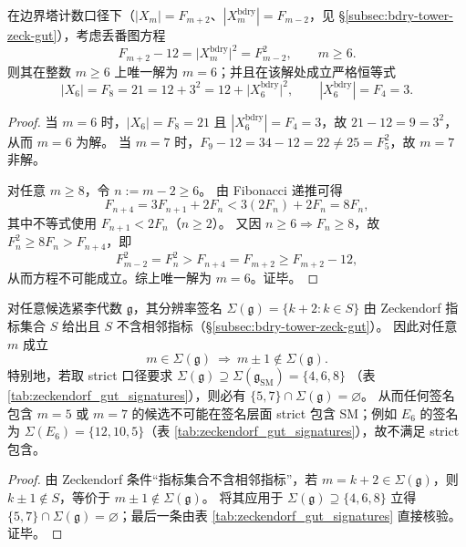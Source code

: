 \begin{theorem}[window-\(6\) 的平方余量刚性：\texorpdfstring{$F_{m+2}-12=F_{m-2}^2$}{F_{m+2}-12=F_{m-2}^2} 的唯一解]\label{thm:sm-square-residual-rigidity-m6}
在边界塔计数口径下（\(|X_m|=F_{m+2}\)、\(|X_m^{\mathrm{bdry}}|=F_{m-2}\)，见 \S\ref{subsec:bdry-tower-zeck-gut}），考虑丢番图方程
\[
F_{m+2}-12=\bigl|X_m^{\mathrm{bdry}}\bigr|^2=F_{m-2}^2,
\qquad m\ge 6.
\]
则其在整数 \(m\ge 6\) 上唯一解为 \(m=6\)；并且在该解处成立严格恒等式
\[
|X_6|=F_8=21=12+3^2
=12+\bigl|X_6^{\mathrm{bdry}}\bigr|^2,
\qquad |X_6^{\mathrm{bdry}}|=F_4=3.
\]
\end{theorem}
\begin{proof}
当 \(m=6\) 时，\(|X_6|=F_8=21\) 且 \(|X_6^{\mathrm{bdry}}|=F_4=3\)，故 \(21-12=9=3^2\)，从而 \(m=6\) 为解。
当 \(m=7\) 时，\(F_9-12=34-12=22\neq 25=F_5^2\)，故 \(m=7\) 非解。
\par
对任意 \(m\ge 8\)，令 \(n:=m-2\ge 6\)。
由 Fibonacci 递推可得
\[
F_{n+4}=3F_{n+1}+2F_n<3(2F_n)+2F_n=8F_n,
\]
其中不等式使用 \(F_{n+1}<2F_n\)（\(n\ge 2\)）。
又因 \(n\ge 6\Rightarrow F_n\ge 8\)，故 \(F_n^2\ge 8F_n>F_{n+4}\)，即
\[
F_{m-2}^2=F_n^2>F_{n+4}=F_{m+2}\ge F_{m+2}-12,
\]
从而方程不可能成立。综上唯一解为 \(m=6\)。证毕。
\end{proof}

\begin{corollary}\label{cor:zeckendorf-no-adjacent-strict-inclusion-impossible}
对任意候选紧李代数 \(\mathfrak g\)，其分辨率签名 \(\Sigma(\mathfrak g)=\{k+2:k\in S\}\) 由 Zeckendorf 指标集合 \(S\) 给出且 \(S\) 不含相邻指标（\S\ref{subsec:bdry-tower-zeck-gut}）。
因此对任意 \(m\) 成立
\[
m\in\Sigma(\mathfrak g)\ \Longrightarrow\ m\pm 1\notin\Sigma(\mathfrak g).
\]
特别地，若取 strict 口径要求
\(
\Sigma(\mathfrak g)\supseteq \Sigma(\mathfrak g_{\mathrm{SM}})=\{4,6,8\}
\)
（表 \ref{tab:zeckendorf_gut_signatures}），则必有
\(
\{5,7\}\cap \Sigma(\mathfrak g)=\varnothing
\)。
从而任何签名包含 \(m=5\) 或 \(m=7\) 的候选不可能在签名层面 strict 包含 SM；例如 \(E_6\) 的签名为 \(\Sigma(E_6)=\{12,10,5\}\)（表 \ref{tab:zeckendorf_gut_signatures}），故不满足 strict 包含。
\end{corollary}
\begin{proof}
由 Zeckendorf 条件“指标集合不含相邻指标”，若 \(m=k+2\in\Sigma(\mathfrak g)\)，则 \(k\pm 1\notin S\)，等价于 \(m\pm 1\notin \Sigma(\mathfrak g)\)。
将其应用于 \(\Sigma(\mathfrak g)\supseteq\{4,6,8\}\) 立得 \(\{5,7\}\cap\Sigma(\mathfrak g)=\varnothing\)；最后一条由表 \ref{tab:zeckendorf_gut_signatures} 直接核验。证毕。
\end{proof}


